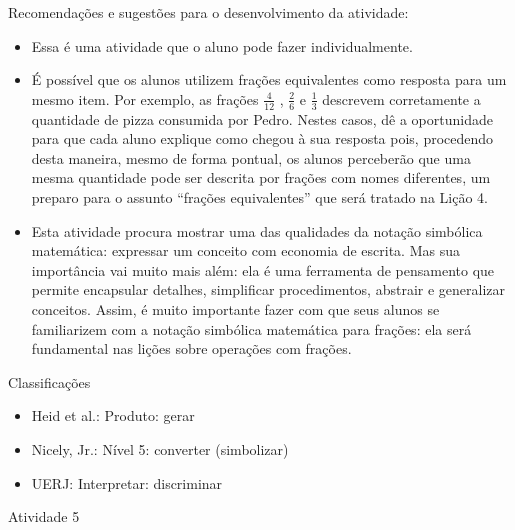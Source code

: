 \documentclass[oneside]{book}
\begin{document}
\begin{multicols}{2}
  Recomendações e sugestões para o desenvolvimento da atividade:
\begin{itemize} %
    \item       Essa é uma atividade que o aluno pode fazer individualmente.
    \item       É possível que os alunos utilizem frações equivalentes como resposta para um mesmo item. Por exemplo, as frações       $\frac{4}{12}$      ,       $\frac{2}{6}$       e       $\frac{1}{3}$        descrevem corretamente a quantidade de pizza consumida por Pedro. Nestes casos, dê a oportunidade para que cada aluno explique como chegou à sua resposta pois, procedendo desta maneira, mesmo de forma pontual, os alunos perceberão que uma mesma quantidade pode ser descrita por frações com nomes diferentes, um preparo para o assunto       ``frações equivalentes''       que será tratado na Lição 4.
    \item       Esta atividade procura mostrar uma das qualidades da notação simbólica matemática: expressar um conceito com economia de escrita. Mas sua importância vai muito mais além: ela é uma ferramenta de pensamento que permite encapsular detalhes, simplificar procedimentos, abstrair e generalizar conceitos. Assim, é muito importante fazer com que seus alunos se familiarizem com a notação simbólica matemática para frações: ela será fundamental nas lições sobre operações com frações.
\end{itemize} %


  Classificações
\begin{itemize} %
    \item       Heid et al.: Produto: gerar
    \item       Nicely, Jr.: Nível 5: converter (simbolizar)
    \item       UERJ: Interpretar: discriminar
\end{itemize} %





\begin{resposta*}{Atividade 5}



\begin{center}
    \begin{tabular}{m{}m{}m{}m{}}
      

\end{tabular}
\end{center}
\end{resposta*}
\end{multicols}
\end{document}
